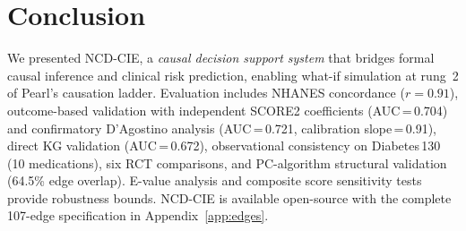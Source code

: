 \documentclass[runningheads]{llncs}
\begin{document}
\section{Conclusion}\label{sec:conclusion}

We presented NCD-CIE, a \emph{causal decision support system}
that bridges formal causal inference and clinical risk prediction,
enabling what-if simulation at rung~2 of Pearl's causation ladder.
Evaluation includes NHANES concordance ($r = 0.91$), outcome-based
validation with independent SCORE2 coefficients (AUC\,=\,0.704)
and confirmatory D'Agostino analysis (AUC\,=\,0.721,
calibration slope\,=\,0.91), direct KG validation (AUC\,=\,0.672),
observational consistency on Diabetes\,130 (10 medications),
six RCT comparisons, and PC-algorithm structural validation
(64.5\% edge overlap).
E-value analysis and composite score sensitivity tests provide
robustness bounds.
NCD-CIE is available open-source with the complete 107-edge
specification in Appendix~\ref{app:edges}.
\end{document}
